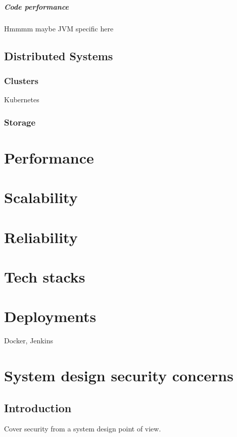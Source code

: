 \documentclass[a4paper, 11pt]{book}
\begin{document}
    \paragraph{Code performance}
    Hmmmm maybe JVM specific here


    \section{Distributed Systems}

    \subsection{Clusters}
    Kubernetes

    \subsection{Storage}


    \chapter{Performance}


    \chapter{Scalability}


    \chapter{Reliability}


    \chapter{Tech stacks}


    \chapter{Deployments}
    Docker, Jenkins


    \chapter{System design security concerns}


    \section{Introduction}
    Cover security from a system design point of view.
\end{document}
